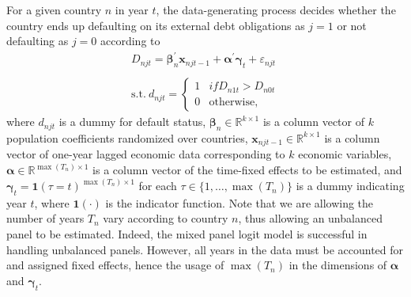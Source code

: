 \documentclass[12pt]{article}
\begin{document}
For a given country $n$ in year $t$, the data-generating process decides whether the country ends up defaulting on its external debt obligations as $j = 1$ or not defaulting as $j = 0$ according to
\begin{align}
D_{njt} = \boldsymbol{\beta}_n^{'} \boldsymbol{x}_{njt-1} + \boldsymbol{\alpha}^{'}\boldsymbol{\gamma}_t + \varepsilon_{njt} \\ \nonumber
\\ 
\text{s.t.} \
d_{njt}=
\begin{cases}
1 & if D_{n1t} > D_{n0t} \nonumber \\ 
0 & \text{otherwise},
\end{cases}
\end{align} 
where $d_{njt}$ is a dummy for default status, $\boldsymbol{\beta}_n \in \mathbb{R}^{k \times 1}$ is a column vector of $k$ population coefficients randomized over countries, $\boldsymbol{x}_{njt-1} \in \mathbb{R}^{k \times 1}$ is a column vector of one-year lagged economic data corresponding to $k$ economic variables, $\boldsymbol{\alpha} \in \mathbb{R}^{\max(T_n) \times 1}$ is a column vector of the time-fixed effects to be estimated, and $\boldsymbol{\gamma}_t = \boldsymbol{1}(\tau = t)^{\max(T_n) \times 1}$ for each $\tau \in \{1, \dots, \max(T_n)\}$ is a dummy indicating year $t$, where $\boldsymbol{1}(\cdot)$ is the indicator function. Note that we are allowing the number of years $T_n$ vary according to country $n$, thus allowing an unbalanced panel to be estimated. Indeed, the mixed panel logit model is successful in handling unbalanced panels. However, all years in the data must be accounted for and assigned fixed effects, hence the usage of $\max(T_n)$ in the dimensions of $\boldsymbol{\alpha}$ and $\boldsymbol{\gamma}_t$.
\end{document}
